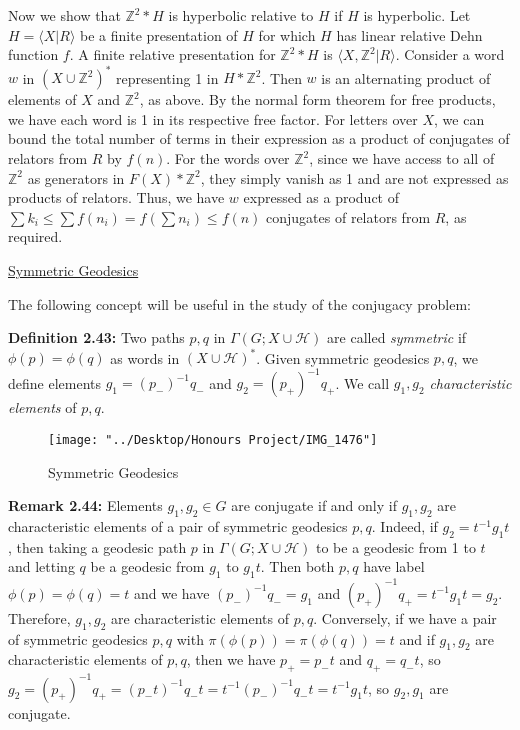 \documentclass[12pt]{article}
\newcommand{\vs}{\vskip10pt}
\begin{document}
	Now we show that $\mathbb{Z}^2 * H$ is hyperbolic relative to $H$ if $H$ is hyperbolic. Let $H = \langle X \vert R \rangle$ be a finite presentation of $H$ for which $H$ has linear relative Dehn function $f$. A finite relative presentation for $\mathbb{Z}^2 * H$ is $\langle X, \mathbb{Z}^2 \vert R \rangle$. Consider a word $w$ in $(X \cup \mathbb{Z}^2)^*$ representing 1 in $H * \mathbb{Z}^2$. Then $w$ is an alternating product of elements of $X$ and $\mathbb{Z}^2$, as above. By the normal form theorem for free products, we have each word is 1 in its respective free factor. For letters over $X$, we can bound the total number of terms in their expression as a product of conjugates of relators from $R$ by $f(n)$. For the words over $\mathbb{Z}^2$, since we have access to all of $\mathbb{Z}^2$ as generators in $F(X) * \mathbb{Z}^2$, they simply vanish as 1 and are not expressed as products of relators. Thus, we have $w$ expressed as a product of $\sum k_i \leq \sum f(n_i) = f (\sum n_i) \leq f(n)$ conjugates of relators from $R$, as required. 
	
	\vs 
	
	\underline{Symmetric Geodesics}
	
	\vs 
	
	The following concept will be useful in the study of the conjugacy problem: 
	
	\vs 
	
	\textbf{Definition 2.43: } Two paths $p,q$ in $\Gamma(G; X \cup \mathcal{H})$ are called \textit{symmetric} if $\phi(p) = \phi(q)$ as words in $(X \cup \mathcal{H})^*$. Given symmetric geodesics $p,q$, we define elements $g_1 = (p_{-})^{-1} q_{-}$ and $g_2 = (p_{+})^{-1}q_{+}$. We call $g_1, g_2$ \textit{characteristic elements} of $p,q$.
	
\begin{figure} [H]
	\centering
	\texttt{[image: "../Desktop/Honours Project/IMG\_1476"]}
	\caption{Symmetric Geodesics}
	\label{fig:img1476}
\end{figure}
	
	\vs 
	
	\textbf{Remark 2.44: } Elements $g_1, g_2 \in G$ are conjugate if and only if $g_1, g_2$ are characteristic elements of a pair of symmetric geodesics $p,q$. Indeed, if $g_2 = t^{-1} g_1 t$, then taking a geodesic path $p$ in $\Gamma(G; X \cup \mathcal{H})$ to be a geodesic from 1 to $t$ and letting $q$ be a geodesic from $g_1$ to $g_1 t$. Then both $p,q$ have label $\phi(p) = \phi(q) = t$ and we have $(p_{-})^{-1} q_{-} = g_1$ and $(p_{+})^{-1} q_{+} = t^{-1} g_1 t = g_2$. Therefore, $g_1, g_2$ are characteristic elements of $p,q$. Conversely, if we have a pair of symmetric geodesics $p,q$ with $\pi(\phi(p)) = \pi(\phi(q)) = t$ and if $g_1, g_2$ are characteristic elements of $p,q$, then we have $p_{+} = p_{-} t$ and $q_{+} = q_{-} t$, so $g_2 = (p_{+})^{-1}q_{+} = (p_{-} t)^{-1} q_{-} t = t^{-1} (p_{-})^{-1} q_{-} t = t^{-1} g_1 t$, so $g_2, g_1$ are conjugate.  
	
\end{document}
